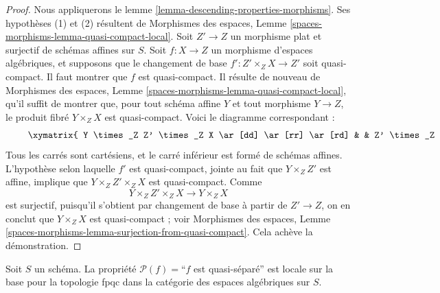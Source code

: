 \begin{proof}
Nous appliquerons le
lemme \ref{lemma-descending-properties-morphisms}.
Ses hypothèses (1) et (2) résultent de
Morphismes des espaces,
Lemme \ref{spaces-morphisms-lemma-quasi-compact-local}.
Soit $Z' \to Z$ un morphisme plat et surjectif de schémas affines sur $S$.
Soit $f : X \to Z$ un morphisme d'espaces algébriques, et supposons
que le changement de base $f' : Z' \times_Z X \to Z'$ soit quasi-compact. Il faut
montrer que $f$ est quasi-compact. Il résulte de nouveau de
Morphismes des espaces,
Lemme \ref{spaces-morphisms-lemma-quasi-compact-local},
qu'il suffit de montrer que, pour tout schéma affine $Y$ et tout
morphisme $Y \to Z$, le produit fibré $Y \times_Z X$ est quasi-compact.
Voici le diagramme correspondant :
\begin{equation}
\label{equation-cube}
\vcenter{
\xymatrix{
Y \times_Z Z' \times_Z X \ar[dd] \ar[rr] \ar[rd] & &
Z' \times_Z X \ar'[d][dd]^{f'} \ar[rd] \\
& Y \times_Z X \ar[dd] \ar[rr] & & X \ar[dd]^f \\
Y \times_Z Z' \ar'[r][rr] \ar[rd] & & Z' \ar[rd] \\
& Y \ar[rr] & & Z
}
}
\end{equation}
Tous les carrés sont cartésiens, et le carré inférieur est formé
de schémas affines. L'hypothèse selon laquelle $f'$ est quasi-compact, jointe au
fait que $Y \times_Z Z'$ est affine, implique que
$Y \times_Z Z' \times_Z X$ est quasi-compact. Comme
$$
Y \times_Z Z' \times_Z X \longrightarrow Y \times_Z X
$$
est surjectif, puisqu'il s'obtient par changement de base à partir de $Z' \to Z$,
on en conclut que $Y \times_Z X$ est quasi-compact ; voir
Morphismes des espaces,
Lemme \ref{spaces-morphisms-lemma-surjection-from-quasi-compact}.
Cela achève la démonstration.
\end{proof}

\begin{lemma}
\label{lemma-descending-property-quasi-separated}
Soit $S$ un schéma.
La propriété $\mathcal{P}(f) =$``$f$ est quasi-séparé''
est locale sur la base pour la topologie fpqc dans la catégorie des espaces algébriques sur $S$.
\end{lemma}

